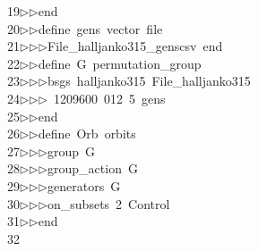 \begin{tabbing}
19\>$\triangleright$\>$\triangleright$\>end\ \\[0pt]
20\>$\triangleright$\>$\triangleright$\>define\ gens\ vector\ file\ \\[0pt]
21\>$\triangleright$\>$\triangleright$\>$\triangleright$\>File\_halljanko315\_genscsv\ end\ \\[0pt]
22\>$\triangleright$\>$\triangleright$\>define\ G\ permutation\_group\ \\[0pt]
23\>$\triangleright$\>$\triangleright$\>$\triangleright$\>bsgs\ halljanko315\ File\_halljanko315\ \\[0pt]
24\>$\triangleright$\>$\triangleright$\>$\triangleright$\ 1209600\ 012\ 5\ gens\ \\[0pt]
25\>$\triangleright$\>$\triangleright$\>end\ \\[0pt]
26\>$\triangleright$\>$\triangleright$\>define\ Orb\ orbits\ \\[0pt]
27\>$\triangleright$\>$\triangleright$\>$\triangleright$\>group\ G\ \\[0pt]
28\>$\triangleright$\>$\triangleright$\>$\triangleright$\>group\_action\ G\ \\[0pt]
29\>$\triangleright$\>$\triangleright$\>$\triangleright$\>generators\ G\ \\[0pt]
30\>$\triangleright$\>$\triangleright$\>$\triangleright$\>on\_subsets\ 2\ Control\ \\[0pt]
31\>$\triangleright$\>$\triangleright$\>end\\[0pt]
32\>\end{tabbing}
